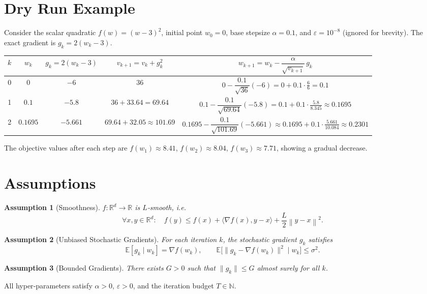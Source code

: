 \documentclass{article}
\newtheorem{assumption}{Assumption}
\newcommand{\E}{\mathbb{E}}
\newcommand{\R}{\mathbb{R}}
\newcommand{\norm}[1]{\left\|#1\right\|}
\newcommand{\grad}{\nabla}
\begin{document}
\vspace{0.5em}
\section*{Dry Run Example}
Consider the scalar quadratic $f(w)=(w-3)^{2}$, initial point $w_{0}=0$, base stepsize $\alpha=0.1$, and $\varepsilon=10^{-8}$ (ignored for brevity).  
The exact gradient is $g_{k}=2(w_{k}-3)$.

\begin{center}
\begin{tabular}{c|c|c|c|c}
$k$ & $w_{k}$ & $g_{k}=2(w_{k}-3)$ & $v_{k+1}=v_{k}+g_{k}^{2}$ & $w_{k+1}=w_{k}-\dfrac{\alpha}{\sqrt{v_{k+1}}}\,g_{k}$\\\hline
0 & $0$ & $-6$ & $36$ & $0-\dfrac{0.1}{\sqrt{36}}(-6)=0+0.1\cdot\frac{6}{6}=0.1$\\\hline
1 & $0.1$ & $-5.8$ & $36+33.64=69.64$ & $0.1-\dfrac{0.1}{\sqrt{69.64}}(-5.8)
      =0.1+0.1\cdot\frac{5.8}{8.345}\approx0.1695$\\\hline
2 & $0.1695$ & $-5.661$ & $69.64+32.05\approx101.69$ &
 $0.1695-\dfrac{0.1}{\sqrt{101.69}}(-5.661)
 \approx0.1695+0.1\cdot\frac{5.661}{10.084}\approx0.2301$\\\hline
\end{tabular}
\end{center}
The objective values after each step are $f(w_{1})\approx8.41$, $f(w_{2})\approx8.04$, $f(w_{3})\approx7.71$, showing a gradual decrease.

\vspace{1em}
\section*{Assumptions}
\begin{assumption}[Smoothness]\label{ass:smooth}
$f:\R^{d}\to\R$ is $L$‑smooth, i.e.
\[
\forall x,y\in\R^{d}:\quad
f(y)\le f(x)+\langle\grad f(x),y-x\rangle+\frac{L}{2}\norm{y-x}^{2}.
\]
\end{assumption}
\begin{assumption}[Unbiased Stochastic Gradients]\label{ass:unbiased}
For each iteration $k$, the stochastic gradient $g_{k}$ satisfies
\[
\E[g_{k}\mid w_{k}]=\grad f(w_{k}),\qquad
\E\big[\|g_{k}-\grad f(w_{k})\|^{2}\mid w_{k}\big]\le\sigma^{2}.
\]
\end{assumption}
\begin{assumption}[Bounded Gradients]\label{ass:bounded}
There exists $G>0$ such that $\|g_{k}\|\le G$ almost surely for all $k$.
\end{assumption}
All hyper‑parameters satisfy $\alpha>0$, $\varepsilon>0$, and the iteration budget $T\in\mathbb{N}$.
\end{document}
